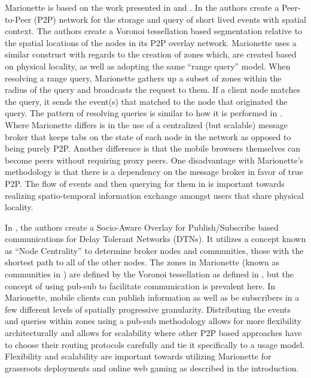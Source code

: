 \documentclass[12pt]{report}	%
\theoremstyle{definition}
\theoremstyle{remark}
\begin{document}
Marionette is based on the work presented in
\cite{zio2011p2p} and
\cite{yoneki2007socio}. In
\cite{zio2011p2p} the authors create a Peer-to-Peer
(P2P) network for the storage and query of short lived events with
spatial context. The authors create a Voronoi tessellation based
segmentation relative to the spatial locations of the nodes in its P2P
overlay network. Marionette uses a similar construct with regards to the
creation of zones which, are created based on physical locality, as well
as adopting the same ``range query'' model. When resolving a range query,
Marionette gathers up a subset of zones within the radius of the query
and broadcasts the request to them. If a client node matches the query,
it sends the event(s) that matched to the node that originated the
query. The pattern of resolving queries is similar to how it is
performed in \cite{zio2011p2p}. Where Marionette
differs is in the use of a centralized (but scalable) message broker
that keeps tabs on the state of each node in the network as opposed to
being purely P2P. Another difference is that the mobile browsers
themselves can become peers without requiring proxy peers.
One disadvantage with Marionette's methodology is that there is a
dependency on the message broker in favor of true P2P. The flow of
events and then querying for them in \cite{zio2011p2p}
is important towards realizing spatio-temporal information exchange
amongst users that share physical locality.

In \cite{yoneki2007socio}, the authors create a
Socio-Aware Overlay for Publish/Subscribe based communications for Delay
Tolerant Networks (DTNs). It utilizes a concept known as ``Node
Centrality'' to determine broker nodes and communities, those with the
shortest path to all of the other nodes. The zones in Marionette (known
as communities in \cite{yoneki2007socio}) are defined
by the Voronoi tessellation as defined in
\cite{zio2011p2p}, but the concept of using pub-sub to
facilitate communication is prevalent here. In Marionette, mobile
clients can publish information as well as be subscribers in a few
different levels of spatially progressive granularity. Distributing the
events and queries within zones using a pub-sub methodology allows for
more flexibility architecturally and allows for scalability where other
P2P based approaches have to choose their routing protocols carefully
and tie it specifically to a usage model. Flexibility and
scalability are important towards utilizing Marionette for grassroots
deployments and online web gaming as described in the introduction.
\end{document}
